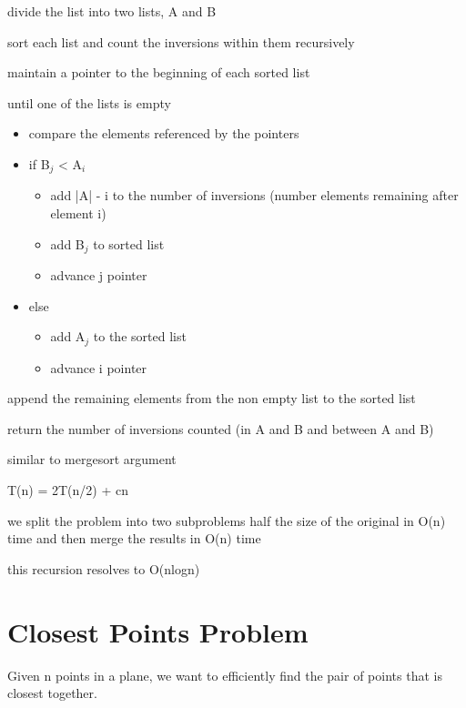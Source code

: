 \algorithm
{
    \item divide the list into two lists, A and B
    \item sort each list and count the inversions within them recursively
    \item maintain a pointer to the beginning of each sorted list
    \item until one of the lists is empty
    \begin{itemize}
        \item compare the elements referenced by the pointers
        \item if B$_{j}$ < A$_{i}$
        \begin{itemize}
            \item add |A| - i to the number of inversions (number elements remaining after element i)
            \item add B$_{j}$ to sorted list
            \item advance j pointer
        \end{itemize}
    \item else
    \begin{itemize}
        \item add A$_{j}$ to the sorted list
        \item advance i pointer
    \end{itemize}
    \end{itemize}
    \item append the remaining  elements from the non empty list to the sorted list
    \item return the number of inversions counted (in A and B and between A and B)
}
{
    \item similar to mergesort argument
}
{
    \item T(n) = 2T(n/2) + cn
    \item we split the problem into two subproblems half the size of the original in O(n) time and then merge the results in O(n) time
    \item this recursion resolves to O(nlogn)
    
}


\section{Closest Points Problem}
Given n points in a plane, we want to efficiently find the pair of points that is closest together.

